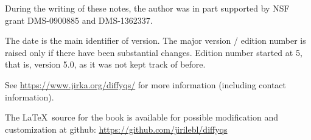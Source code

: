 \documentclass[12pt]{book}
\begin{document}
\begin{small}
\bigskip

\noindent
During the writing of these notes, 
the author was in part supported by NSF grant DMS-0900885 and
DMS-1362337.

\bigskip

\noindent
The date is the main identifier of version.  The major version / edition
number is raised only if there have been substantial changes.
Edition
number started at 5, that is, version 5.0, as it was not kept track of
before.

\bigskip

\noindent
See \url{https://www.jirka.org/diffyqs/} for more information
(including contact information).

\bigskip

\noindent
The \LaTeX\ source for the book is available
for possible modification and customization
at github: \url{https://github.com/jirilebl/diffyqs}
\end{small}

\diffytableofcontents

\newpage















\addextraspacetotoc
\end{document}
